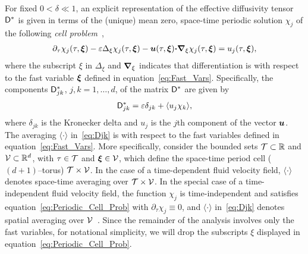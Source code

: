 \documentclass[amsa]{ipart}
\begin{document}
For fixed $0<\delta\ll1$, an explicit representation of the
effective diffusivity tensor $\mathsf{D}^*$ is given in terms of the (unique)
mean zero, space-time periodic solution $\chi_j$ of the following
\emph{cell problem}~\cite{Biferale:PF:2725,Majda:Kramer:1999:book}, 
%
\begin{align}\label{eq:Periodic_Cell_Prob}
  \partial_\tau\chi_j(\tau,\vecxi)
  -\varepsilon\Delta_\xi\chi_j(\tau,\vecxi)
  -\vecu(\tau,\vecxi) \bcdot\bnabla_\xi \chi_j(\tau,\vecxi)
  =u_j(\tau,\vecxi),
\end{align}
%
where the subscript $\xi$ in $\Delta_\xi$ and $\mbox{\boldmath${\nabla}$}_\xi$
indicates that differentiation is with respect to the fast variable
$\boldsymbol{\xi}$ defined in equation~\eqref{eq:Fast_Vars}. Specifically,
the components $\mathsf{D}^*_{jk}$, $j,k=1,\ldots,d$, of the matrix $\mathsf{D}^*$ are given
by~\cite{McLaughlin:SIAM_JAM:780,Fannjiang:1994:SIAM_JAM:333,Majda:Kramer:1999:book}          
%
\begin{align}\label{eq:Djk}
  \Dm^*_{jk}=\varepsilon\delta_{jk}+\langle u_j\chi_k\rangle,
\end{align}
%
where $\delta_{jk}$ is the Kronecker delta and $u_j$ is the $j$th component
of the vector $\boldsymbol{u}$. The averaging $\langle\cdot\rangle$ in~\eqref{eq:Djk} is with
respect to the fast variables defined in
equation~\eqref{eq:Fast_Vars}. More specifically, consider the bounded
sets  $\mathcal{T}\subset\mathbb{R}$ and $\mathcal{V}\subset\mathbb{R}^d$, with $\tau\in\mathcal{T}$ and
$\boldsymbol{\xi}\in\mathcal{V}$, which define the space-time period cell ($(d+1)$--torus)
$\mathcal{T}\times\mathcal{V}$. In the case of a time-dependent fluid velocity field, $\langle\cdot\rangle$
denotes space-time averaging over $\mathcal{T}\times\mathcal{V}$. In the special case of a
time-independent fluid velocity field, the function $\chi_j$ is
time-independent and satisfies equation~\eqref{eq:Periodic_Cell_Prob}
with $\partial_\tau\chi_j\equiv0$, and $\langle\cdot\rangle$ in~\eqref{eq:Djk} denotes spatial averaging over
$\mathcal{V}$~\cite{Fannjiang:1994:SIAM_JAM:333,Majda:Kramer:1999:book}. Since
the remainder of the analysis involves only the fast variables, for
notational simplicity, we will drop the subscripts $\xi$ displayed in
equation~\eqref{eq:Periodic_Cell_Prob}. 
\end{document}

